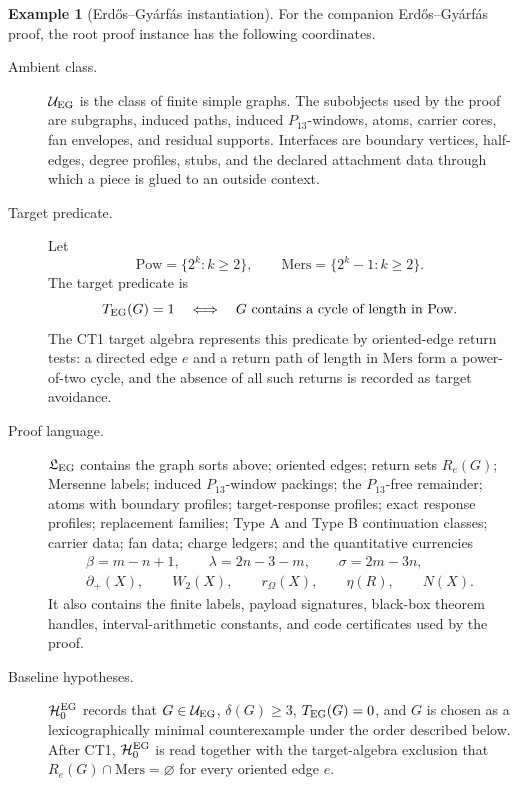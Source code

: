 \documentclass[
  11pt,
]{article}
\theoremstyle{definition}
\newtheorem{example}{Example}[section]
\begin{document}
\begin{example}[Erdős--Gyárfás instantiation]\label{ex:eg-branch-state}
For the companion Erdős--Gyárfás proof, the root proof instance has the
following coordinates.

\begin{description}
\item[Ambient class.]
\(\mathcal U_{\rm EG}\) is the class of finite simple graphs.  The
subobjects used by the proof are subgraphs, induced paths, induced
\(P_{13}\)-windows, atoms, carrier cores, fan envelopes, and residual
supports.  Interfaces are boundary vertices, half-edges, degree
profiles, stubs, and the declared attachment data through which a piece
is glued to an outside context.

\item[Target predicate.]
Let
\[
\mathrm{Pow}=\{2^k:k\ge2\},\qquad
\mathrm{Mers}=\{2^k-1:k\ge2\}.
\]
The target predicate is
\[
T_{\rm EG}(G)=1
\quad\Longleftrightarrow\quad
G\text{ contains a cycle of length in }\mathrm{Pow}.
\]
The CT1 target algebra represents this predicate by oriented-edge return
tests: a directed edge \(e\) and a return path of length in
\(\mathrm{Mers}\) form a power-of-two cycle, and the absence of all such
returns is recorded as target avoidance.

\item[Proof language.]
\(\mathfrak L_{\rm EG}\) contains the graph sorts above; oriented edges;
return sets \(R_e(G)\); Mersenne labels; induced \(P_{13}\)-window
packings; the \(P_{13}\)-free remainder; atoms with boundary profiles;
target-response profiles; exact response profiles; replacement
families; Type A and Type B continuation classes; carrier data; fan
data; charge ledgers; and the quantitative currencies
\[
\begin{gathered}
\beta=m-n+1,\qquad
\lambda=2n-3-m,\qquad
\sigma=2m-3n,\\
\partial_+(X),\qquad W_2(X),\qquad r_\Omega(X),\qquad
\eta(R),\qquad N(X).
\end{gathered}
\]
It also contains the finite labels, payload signatures, black-box
theorem handles, interval-arithmetic constants, and code certificates
used by the proof.

\item[Baseline hypotheses.]
\(\mathcal H^{\rm EG}_0\) records that \(G\in\mathcal U_{\rm EG}\),
\(\delta(G)\ge3\), \(T_{\rm EG}(G)=0\), and \(G\) is chosen as a
lexicographically minimal counterexample under the order described
below.  After CT1, \(\mathcal H^{\rm EG}_0\) is read together with the
target-algebra exclusion that \(R_e(G)\cap\mathrm{Mers}=\varnothing\) for
every oriented edge \(e\).


\end{description}
\end{example}
\end{document}
